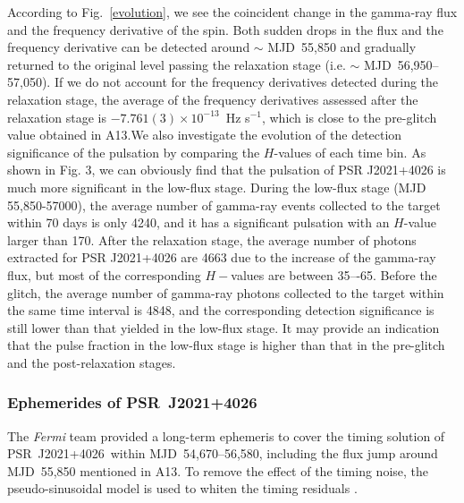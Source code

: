 \documentclass[12pt,preprint]{aastex}
\newcommand{\psr}{PSR~J2021+4026}
\begin{document}
According to Fig.~\ref{evolution}, we see the coincident change in the gamma-ray flux and the frequency derivative of the spin.
Both sudden drops in the flux and the frequency derivative can be detected around $\sim$ MJD~55,850 and gradually returned to the original level passing the relaxation stage (i.e. $\sim$ MJD~56,950--57,050).
If we do not account for the frequency derivatives detected during the relaxation stage, the average of the  frequency derivatives assessed after the
relaxation stage is $-7.761(3)\times 10^{-13}$~Hz s$^{-1}$, which is close
to the pre-glitch value obtained in A13.We also investigate the evolution of the detection significance of the pulsation by comparing the $H$-values of each time bin. As shown in Fig. 3, we can obviously find that the pulsation of PSR J2021+4026 is much more significant in the low-flux stage.
During the low-flux stage (MJD 55,850-57000), the average number of
gamma-ray events collected to the target within 70 days is only 4240, and it has a significant pulsation with an $H$-value larger than 170. After the relaxation stage, the average number of photons extracted for PSR J2021+4026 are 4663 due to the increase of the gamma-ray flux, but most of
the corresponding $H-$values are between 35–-65.
Before the glitch, the average number of  gamma-ray photons collected
to the target within the same time interval is 4848, and the corresponding detection significance is still lower than that yielded in the low-flux stage.
It may provide an indication that the pulse fraction in the  low-flux stage
is higher than that in the pre-glitch and the post-relaxation stages.

\subsubsection{Ephemerides of \psr}
\label{sssec:ephemeris}

The \emph{Fermi} team provided a long-term ephemeris to cover the timing solution of \psr\ within MJD~54,670--56,580, including the flux jump around MJD~55,850 mentioned in A13.
To remove the effect of the timing noise, the pseudo-sinusoidal model is used to whiten the timing residuals \citep{Hobbs2004}.
\end{document}
